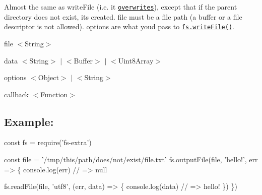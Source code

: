 Almost the same as {\ttfamily write\+File} (i.\+e. it \href{http://pages.citebite.com/v2o5n8l2f5reb}{\tt overwrites}), except that if the parent directory does not exist, it\textquotesingle{}s created. {\ttfamily file} must be a file path (a buffer or a file descriptor is not allowed). {\ttfamily options} are what you\textquotesingle{}d pass to \href{https://nodejs.org/api/fs.html#fs_fs_writefile_file_data_options_callback}{\tt {\ttfamily fs.\+write\+File()}}.


\begin{DoxyItemize}
\item {\ttfamily file} {\ttfamily $<$String$>$}
\item {\ttfamily data} {\ttfamily $<$String$>$ $\vert$ $<$Buffer$>$ $\vert$ $<$Uint8\+Array$>$}
\item {\ttfamily options} {\ttfamily $<$Object$>$ $\vert$ $<$String$>$}
\item {\ttfamily callback} {\ttfamily $<$Function$>$}
\end{DoxyItemize}

\subsection*{Example\+:}


\begin{DoxyCode}
const fs = require('fs-extra')

const file = '/tmp/this/path/does/not/exist/file.txt'
fs.outputFile(file, 'hello!', err => \{
  console.log(err) // => null

  fs.readFile(file, 'utf8', (err, data) => \{
    console.log(data) // => hello!
  \})
\})
\end{DoxyCode}
 